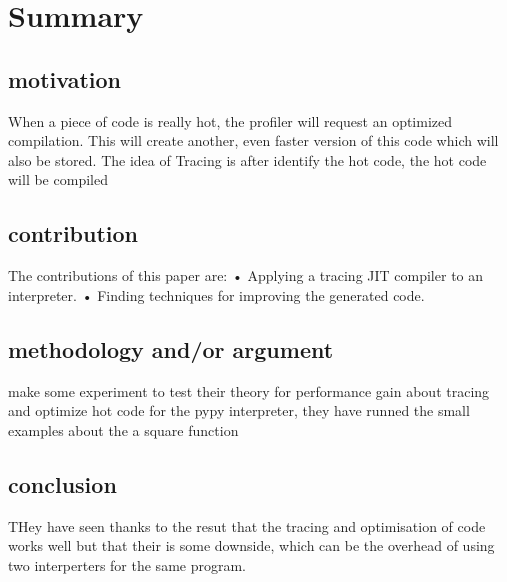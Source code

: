 \section{Summary}

\subsection{motivation}
When a piece of code is really hot, the profiler will request an optimized compilation. This will create another, even faster version of this code which will also be stored.
The idea of Tracing is after identify the hot code, the hot code will be compiled 
\subsection{contribution}
The contributions of this paper are:
• Applying a tracing JIT compiler to an interpreter.
• Finding techniques for improving the generated code.
\subsection{methodology and/or argument}
\cite{bolz2009tracing} make some experiment to test their theory for performance gain about tracing and optimize hot code for the pypy interpreter, they have runned the small examples about the a square function
\subsection{conclusion}
THey have seen thanks to the resut that the tracing and optimisation of code works well but that their is some downside,
which can be the overhead of using two interperters for the same program.